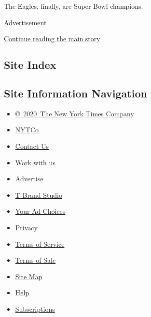 The Eagles, finally, are Super Bowl champions.

Advertisement

\protect\hyperlink{after-bottom}{Continue reading the main story}

\hypertarget{site-index}{%
\subsection{Site Index}\label{site-index}}

\hypertarget{site-information-navigation}{%
\subsection{Site Information
Navigation}\label{site-information-navigation}}

\begin{itemize}
\tightlist
\item
  \href{https://help.nytimes3xbfgragh.onion/hc/en-us/articles/115014792127-Copyright-notice}{©~2020~The
  New York Times Company}
\end{itemize}

\begin{itemize}
\tightlist
\item
  \href{https://www.nytco.com/}{NYTCo}
\item
  \href{https://help.nytimes3xbfgragh.onion/hc/en-us/articles/115015385887-Contact-Us}{Contact
  Us}
\item
  \href{https://www.nytco.com/careers/}{Work with us}
\item
  \href{https://nytmediakit.com/}{Advertise}
\item
  \href{http://www.tbrandstudio.com/}{T Brand Studio}
\item
  \href{https://www.nytimes3xbfgragh.onion/privacy/cookie-policy\#how-do-i-manage-trackers}{Your
  Ad Choices}
\item
  \href{https://www.nytimes3xbfgragh.onion/privacy}{Privacy}
\item
  \href{https://help.nytimes3xbfgragh.onion/hc/en-us/articles/115014893428-Terms-of-service}{Terms
  of Service}
\item
  \href{https://help.nytimes3xbfgragh.onion/hc/en-us/articles/115014893968-Terms-of-sale}{Terms
  of Sale}
\item
  \href{https://spiderbites.nytimes3xbfgragh.onion}{Site Map}
\item
  \href{https://help.nytimes3xbfgragh.onion/hc/en-us}{Help}
\item
  \href{https://www.nytimes3xbfgragh.onion/subscription?campaignId=37WXW}{Subscriptions}
\end{itemize}
